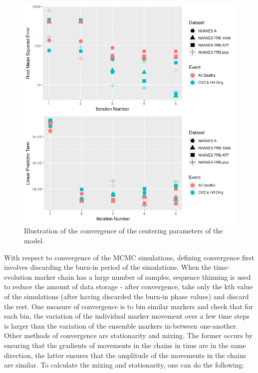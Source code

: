 \documentclass[
]{article}
\begin{document}
\begin{figure}
\hypertarget{fig:linpred_conv}{%
\centering
\includegraphics{./Rmarkdown_Plots/RMSE-Linpred_Convergence.png}
\caption{Illustration of the convergence of the centering parameters of the model.}\label{fig:linpred_conv}
}
\end{figure}

With respect to convergence of the MCMC simulations, defining convergence first involves discarding the burn-in period of the simulations. When the time-evolution marker chain has a large number of samples, sequence thinning is used to reduce the amount of data storage - after convergence, take only the kth value of the simulations (after having discarded the burn-in phase values) and discard the rest. One measure of convergence is to bin similar markers and check that for each bin, the variation of the individual marker movement over a few time steps is larger than the variation of the ensemble markers in-between one-another. Other methods of convergence are stationarity and mixing. The former occurs by ensuring that the gradients of movements in the chains in time are in the same direction, the latter ensures that the amplitude of the movements in the chains are similar. To calculate the mixing and stationarity, one can do the following:
\end{document}
